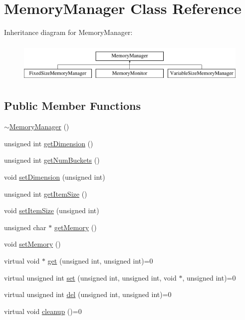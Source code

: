 \hypertarget{classMemoryManager}{
\section{MemoryManager Class Reference}
\label{classMemoryManager}
}
Inheritance diagram for MemoryManager:\begin{figure}[H]
\begin{center}
\leavevmode
\includegraphics[height=1.97531cm]{classMemoryManager}
\end{center}
\end{figure}
\subsection*{Public Member Functions}
\begin{DoxyCompactItemize}
\item 
\hyperlink{classMemoryManager_ad4570910ccfc14b2da679bee58ee8f48}{$\sim$MemoryManager} ()
\item 
unsigned int \hyperlink{classMemoryManager_a1ee0a507083f71a998f4b5183e34e694}{getDimension} ()
\item 
unsigned int \hyperlink{classMemoryManager_a8ed9694ea695f4533afb06fc595d371f}{getNumBuckets} ()
\item 
void \hyperlink{classMemoryManager_ad415c63e1b6d3b23eb3af19577f205a9}{setDimension} (unsigned int)
\item 
unsigned int \hyperlink{classMemoryManager_a0a2a789513ac6d8349cfa536e2257330}{getItemSize} ()
\item 
void \hyperlink{classMemoryManager_adf8808f7cd5cabe38563bfffa1284174}{setItemSize} (unsigned int)
\item 
unsigned char $\ast$ \hyperlink{classMemoryManager_a0b8102e0c6b8c3609678e11d1384efb2}{getMemory} ()
\item 
void \hyperlink{classMemoryManager_adc25f40b62f5dadf19c378cdac747adc}{setMemory} ()
\item 
virtual void $\ast$ \hyperlink{classMemoryManager_ad1786ab026c6077405e3c963e05d4a26}{get} (unsigned int, unsigned int)=0
\item 
virtual unsigned int \hyperlink{classMemoryManager_a53a7f4663f763985ce93f36d76d08370}{set} (unsigned int, unsigned int, void $\ast$, unsigned int)=0
\item 
virtual unsigned int \hyperlink{classMemoryManager_af63cdf4a0fdbd5eb328e13959ff4c5b5}{del} (unsigned int, unsigned int)=0
\item 
virtual void \hyperlink{classMemoryManager_ab24d56675e49909dfa6ccc67163d9add}{cleanup} ()=0
\end{DoxyCompactItemize}


